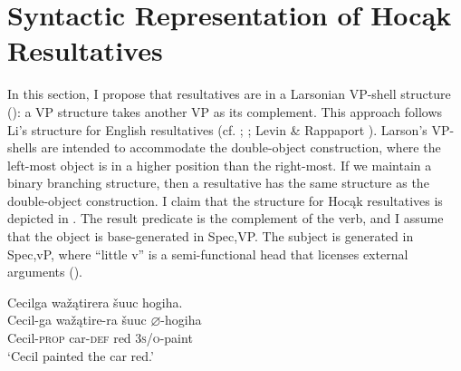 \documentclass[output=paper]{LSP/langsci}
\begin{document}
\section{Syntactic Representation of Hocąk Resultatives}
 
In this section, I propose that resultatives are in a Larsonian VP-shell structure (\citealt{Larson1988}): a VP structure takes another VP as its complement. This approach follows Li's  structure for English resultatives (cf. \citealt{Hoekstra1988};  \citealt{CarrierRandall1992}; Levin \& Rappaport \citealt{Hovav1995}). Larson's  VP-shells are intended to accommodate the double-object construction, where the left-most object is in a higher position than the right-most. If we maintain a binary branching structure, then a resultative has the same structure as the double-object construction. I claim that the structure for Hocąk resultatives is depicted in . The result predicate is the complement of the verb, and I assume that the object is base-generated in Spec,VP. The subject is generated in Spec,vP, where ``little v'' is a semi-functional head that licenses external arguments (\citealt{Chomsky1995}).

\begin{exe}
\ex
\begin{xlist}

\ex \glll Cecilga wažątirera šuuc hogiha. \\
Cecil-ga  wažątire-ra šuuc {$\varnothing$}-hogiha \\
Cecil-\textsc{prop} car-\textsc{def} red \textsc{3s/o}-paint\\
\glt `Cecil painted the car red.'

\ex 
{\hspace{1em}}\newline
{}
\end{xlist}
\end{exe}
\end{document}
